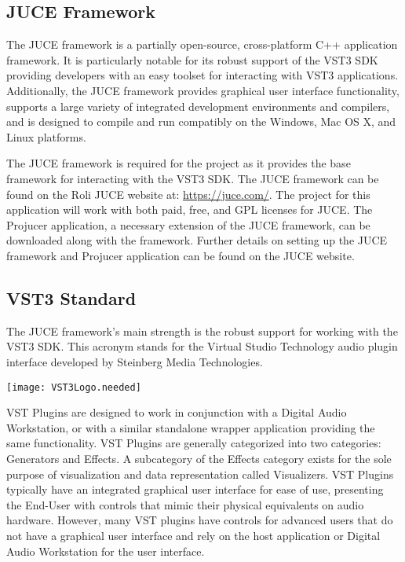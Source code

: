 \documentclass[a4paper,12pt]{report}
\begin{document}
\subsection{JUCE Framework}
The JUCE framework is a partially open-source, cross-platform C++ application framework. It is particularly notable for its robust support of the VST3 SDK providing developers with an easy toolset for interacting with VST3 applications. Additionally, the JUCE framework provides graphical user interface functionality, supports a large variety of integrated development environments and compilers, and is designed to compile and run compatibly on the Windows, Mac OS X, and Linux platforms.

The JUCE framework is required for the project as it provides the base framework for interacting with the VST3 SDK. The JUCE framework can be found on the Roli JUCE website at: \href{https://juce.com/}{https://juce.com/}. The project for this application will work with both paid, free, and GPL licenses for JUCE. The Projucer application, a necessary extension of the JUCE framework, can be downloaded along with the framework. Further details on setting up the JUCE framework and Projucer application can be found on the JUCE website.


\subsection{VST3 Standard}
The JUCE framework's main strength is the robust support for working with the VST3 SDK. This acronym stands for the Virtual Studio Technology audio plugin interface developed by Steinberg Media Technologies. 

\texttt{[image: VST3Logo.needed]}

VST Plugins are designed to work in conjunction with a Digital Audio Workstation, or with a similar standalone wrapper application providing the same functionality. VST Plugins are generally categorized into two categories: Generators and Effects. A subcategory of the Effects category exists for the sole purpose of visualization and data representation called Visualizers. VST Plugins typically have an integrated graphical user interface for ease of use, presenting the End-User with controls that mimic their physical equivalents on audio hardware. However, many VST plugins have controls for advanced users that do not have a graphical user interface and rely on the host application or Digital Audio Workstation for the user interface.
\end{document}
